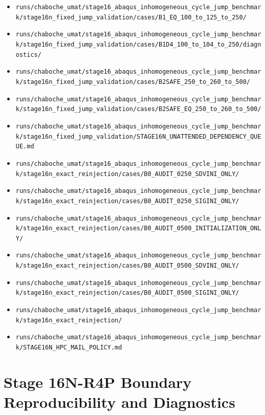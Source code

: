 \documentclass[11pt,a4paper]{article}
\newcommand{\code}[1]{\texttt{#1}}
\begin{document}
\begin{itemize}
  \item \code{runs/chaboche\_umat/stage16\_abaqus\_inhomogeneous\_cycle\_jump\_benchmark/stage16n\_fixed\_jump\_validation/cases/B1\_EQ\_100\_to\_125\_to\_250/}
  \item \code{runs/chaboche\_umat/stage16\_abaqus\_inhomogeneous\_cycle\_jump\_benchmark/stage16n\_fixed\_jump\_validation/cases/B1D4\_100\_to\_104\_to\_250/diagnostics/}
  \item \code{runs/chaboche\_umat/stage16\_abaqus\_inhomogeneous\_cycle\_jump\_benchmark/stage16n\_fixed\_jump\_validation/cases/B2SAFE\_250\_to\_260\_to\_500/}
  \item \code{runs/chaboche\_umat/stage16\_abaqus\_inhomogeneous\_cycle\_jump\_benchmark/stage16n\_fixed\_jump\_validation/cases/B2SAFE\_EQ\_250\_to\_260\_to\_500/}
  \item \code{runs/chaboche\_umat/stage16\_abaqus\_inhomogeneous\_cycle\_jump\_benchmark/stage16n\_fixed\_jump\_validation/STAGE16N\_UNATTENDED\_DEPENDENCY\_QUEUE.md}
  \item \code{runs/chaboche\_umat/stage16\_abaqus\_inhomogeneous\_cycle\_jump\_benchmark/stage16n\_exact\_reinjection/cases/B0\_AUDIT\_0250\_SDVINI\_ONLY/}
  \item \code{runs/chaboche\_umat/stage16\_abaqus\_inhomogeneous\_cycle\_jump\_benchmark/stage16n\_exact\_reinjection/cases/B0\_AUDIT\_0250\_SIGINI\_ONLY/}
  \item \code{runs/chaboche\_umat/stage16\_abaqus\_inhomogeneous\_cycle\_jump\_benchmark/stage16n\_exact\_reinjection/cases/B0\_AUDIT\_0500\_INITIALIZATION\_ONLY/}
  \item \code{runs/chaboche\_umat/stage16\_abaqus\_inhomogeneous\_cycle\_jump\_benchmark/stage16n\_exact\_reinjection/cases/B0\_AUDIT\_0500\_SDVINI\_ONLY/}
  \item \code{runs/chaboche\_umat/stage16\_abaqus\_inhomogeneous\_cycle\_jump\_benchmark/stage16n\_exact\_reinjection/cases/B0\_AUDIT\_0500\_SIGINI\_ONLY/}
  \item \code{runs/chaboche\_umat/stage16\_abaqus\_inhomogeneous\_cycle\_jump\_benchmark/stage16n\_exact\_reinjection/}
  \item \code{runs/chaboche\_umat/stage16\_abaqus\_inhomogeneous\_cycle\_jump\_benchmark/STAGE16N\_HPC\_MAIL\_POLICY.md}
\end{itemize}

\section{Stage 16N-R4P Boundary Reproducibility and Diagnostics}
\end{document}
